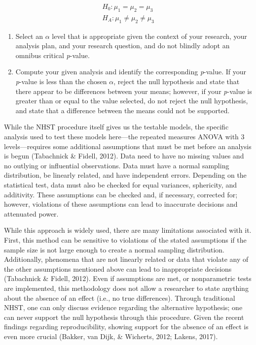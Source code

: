 \documentclass[english,man]{apa6}
\theoremstyle{definition}
\theoremstyle{definition}
\theoremstyle{definition}
\theoremstyle{remark}
\begin{document}
\[
\begin{aligned}
  H_0: \mu_1 = \mu_2 = \mu_3 \\
  H_A: \mu_1 \neq \mu_2 \neq \mu_3
\end{aligned}
\]

\begin{enumerate}
\def\labelenumi{\arabic{enumi})}
\setcounter{enumi}{1}
\item
  Select an \(\alpha\) level that is appropriate given the context of
  your research, your analysis plan, and your research question, and do
  not blindly adopt an omnibus critical \emph{p}-value.
\item
  Compute your given analysis and identify the corresponding
  \emph{p}-value. If your \emph{p}-value is less than the chosen
  \(\alpha\), reject the null hypothesis and state that there appear to
  be differences between your means; however, if your \emph{p}-value is
  greater than or equal to the value selected, do not reject the null
  hypothesis, and state that a difference between the means could not be
  supported.
\end{enumerate}

While the NHST procedure itself gives us the testable models, the
specific analysis used to test these models here---the repeated measures
ANOVA with 3 levels---requires some additional assumptions that must be
met before an analysis is begun (Tabachnick \& Fidell, 2012). Data need
to have no missing values and no outlying or influential observations.
Data must have a normal sampling distribution, be linearly related, and
have independent errors. Depending on the statistical test, data must
also be checked for equal variances, sphericity, and additivity. These
assumptions can be checked and, if necessary, corrected for; however,
violations of these assumptions can lead to inaccurate decisions and
attenuated power.

While this approach is widely used, there are many limitations
associated with it. First, this method can be sensitive to violations of
the stated assumptions if the sample size is not large enough to create
a normal sampling distribution. Additionally, phenomena that are not
linearly related or data that violate any of the other assumptions
mentioned above can lead to inappropriate decisions (Tabachnick \&
Fidell, 2012). Even if assumptions are met, or nonparametric tests are
implemented, this methodology does not allow a researcher to state
anything about the absence of an effect (i.e., no true differences).
Through traditional NHST, one can only discuss evidence regarding the
alternative hypothesis; one can never support the null hypothesis
through this procedure. Given the recent findings regarding
reproducibility, showing support for the absence of an effect is even
more crucial (Bakker, van Dijk, \& Wicherts, 2012; Lakens, 2017).
\end{document}
